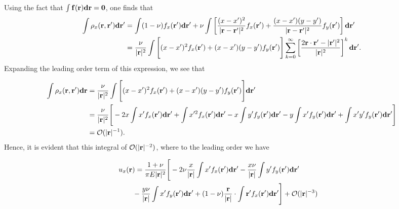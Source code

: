 \documentclass[aps,prl,reprint,twocolumn,groupedaddress,showpacs]{revtex4}
\def\d{{\bf d}}
\def\f{{\bf f}}
\def\r{{\bf r}}
\begin{document}
\begin{widetext}
Using the fact that $\int \f(\r)\d\r = \mathbf{0}$, one finds that
%
\begin{align}
\int \rho_{x}(\r,\r')\d\r'  & =  \int (1-\nu)f_x(\r')\d\r'
+\nu\int\left[\frac{(x - x')^2}{|\r-\r'|^2} f_{x}(\r') +
\frac{(x-x')(y-y')}{|\r-\r'|^2} f_y(\r')  \right]\d\r' \nonumber\\
\: &= \frac{\nu}{|\r|^2}\int\Bigg[(x - x')^2f_{x}(\r')
+ (x-x')(y-y')f_y(\r')  \Bigg]
\sum_{k=0}^\infty \left[\frac{2\r\cdot\r' - |\r'|^2}{|\r|^2} \right]^k \d\r'.
\end{align}
%
Expanding the leading order term of this expression, we see that

\begin{align*}
\int\rho_{x}(\r,\r')\d\r 
&= \frac{\nu}{|\r|^2}\int\Bigg[(x- x')^2f_{x}(\r')+(x-x')(y-y')f_y(\r')\Bigg]
\d\r' \nonumber\\
\: &= \frac{\nu}{|\r|^2}  \Bigg[  -2x\int x' f_x(\r')\d\r'  + \int x'^2 f_x(\r')\d\r'- x\int y' f_y(\r') \d\r'
- y\int x' f_y(\r')\d\r'
+ \int x'y' f_y(\r') \d\r'\Bigg] \nonumber \\
\: & =\mathcal{O}(|\r|^{-1}).
\end{align*}
%
Hence, it is evident that this integral of $\mathcal{O}(|\r|^{-2})$,
where to the leading order we have

\begin{align}
\lefteqn{u_x(\r) = \frac{1+\nu}{\pi E |\r|^2}
\Bigg[ -2\nu\frac{x}{|\r|}\int x' f_x(\r')\d\r'
-\frac{x\nu}{|\r|}\int y' f_y(\r') \d\r'  }\nonumber\\
&\qquad- \frac{y\nu}{|\r|}\int x' f_y(\r')\d\r' 
+ (1-\nu)\frac{\r}{|\r|}\cdot\int \r' f_x(\r') \d\r'\Bigg] + \mathcal{O}(|\r|^{-3})
\end{align}




\end{widetext}
\end{document}
